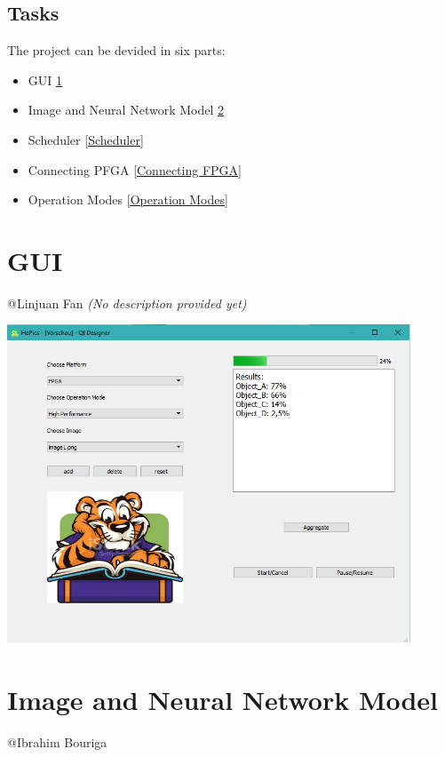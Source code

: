 \documentclass[parskip=full]{scrartcl}
\newcommand\tab[1][1cm]{\hspace*{#1}}
\begin{document}
	\subsection{Tasks}
	\tab The project can be devided in six parts:
	\tab \begin{itemize}
	\item GUI \ref{GUI}
	\item Image and Neural Network Model  \ref{Image and Neural Network Model}
	\item Scheduler \ref{Scheduler}
	\item Connecting PFGA \ref{Connecting FPGA}
	\item Operation Modes  \ref{Operation Modes}
	\end{itemize}
	
\section{GUI} \label{GUI}
	@Linjuan Fan \textit{(No description provided yet)}
	\begin{center}
		\includegraphics[width=0.9\textwidth]{NewMainWindow}
	\end{center}


\pagebreak

\section {Image and Neural Network Model} \label{Image and Neural Network Model}
	@Ibrahim Bouriga
	
\end{document}
